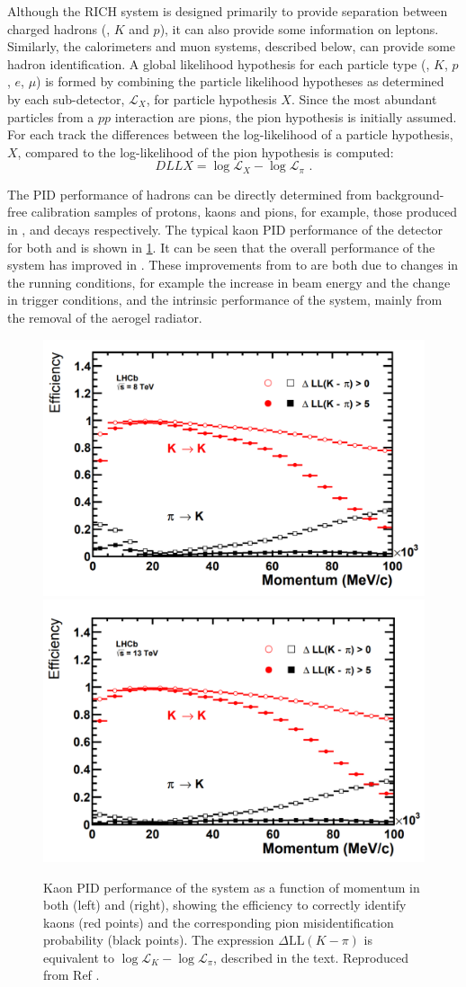 Although the RICH system is designed primarily to provide separation between charged hadrons (\pion, $K$ and $p$), it can also provide some information on leptons. Similarly, the calorimeters and muon systems, described below, can provide some hadron identification. A global likelihood hypothesis for each particle type (\pion, $K$, $p$, $e$, $\mu$) is formed by combining the particle likelihood hypotheses as determined by each sub-detector, $\mathcal{L}_X$, for particle hypothesis $X$. Since the most abundant particles from a $pp$ interaction are pions, the pion hypothesis is initially assumed. For each track the differences between the log-likelihood of a particle hypothesis, $X$, compared to the log-likelihood of the pion hypothesis is computed:
\begin{equation}
DLLX = \log{\mathcal{L}_X} - \log{\mathcal{L}_{\pi}} \text{ .}
\end{equation}

The PID performance of hadrons can be directly determined from background-free calibration samples of protons, kaons and pions, for example, those produced in \Lz, \Dstarm and \KS decays respectively. The typical kaon PID performance of the \lhcb detector for both \runone and \runtwo is shown in \fig\ref{richperformance}. It can be seen that the overall performance of the \rich system has improved in \runtwo. These improvements from \runone to \runtwo are both due to changes in the running conditions, for example the increase in beam energy and the change in trigger conditions, and the intrinsic performance of the \rich system, mainly from the removal of the aerogel radiator.

\begin{figure}
\includegraphics[width=0.5\linewidth]{figures/detector/richperformance_run1.pdf}
\includegraphics[width=0.5\linewidth]{figures/detector/richperformance_run2.pdf}
\caption{Kaon PID performance of the \rich system as a function of momentum in both \runone (left) and \runtwo (right), showing the efficiency to correctly identify kaons (red points) and the corresponding pion misidentification probability (black points). The expression $\Delta \text{LL}(K - \pi)$ is equivalent to $\log{\mathcal{L}_K} - \log{\mathcal{L}_{\pi}}$, described in the text. Reproduced from Ref \cite{richrun2}.}
\label{richperformance}
\end{figure}

